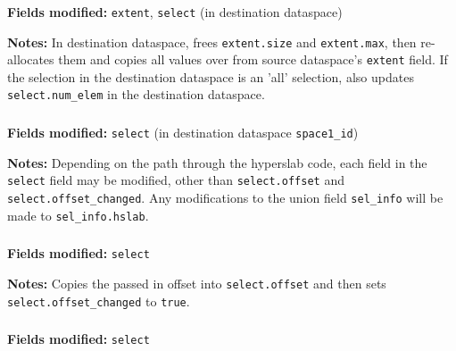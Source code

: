 \documentclass[../HDF5_RFC.tex]{subfiles}
\begin{document}
\subsubsection{}

\textbf{Fields modified:} \texttt{extent}, \texttt{select} (in destination dataspace)

\textbf{Notes:} In destination dataspace, frees \texttt{extent.size} and \texttt{extent.max}, then
re-allocates them and copies all values over from source dataspace's \texttt{extent} field. If the
selection in the destination dataspace is an 'all' selection, also updates \texttt{select.num\_elem}
in the destination dataspace.

\subsubsection{}

\textbf{Fields modified:} \texttt{select} (in destination dataspace \texttt{space1\_id})

\textbf{Notes:} Depending on the path through the hyperslab code, each field in the \texttt{select}
field may be modified, other than \texttt{select.offset} and \texttt{select.offset\_changed}. Any
modifications to the union field \texttt{sel\_info} will be made to \texttt{sel\_info.hslab}.

\subsubsection{}

\textbf{Fields modified:} \texttt{select}

\textbf{Notes:} Copies the passed in offset into \texttt{select.offset} and then sets
\texttt{select.offset\_changed} to \texttt{true}.

\subsubsection{}

\textbf{Fields modified:} \texttt{select}
\end{document}
